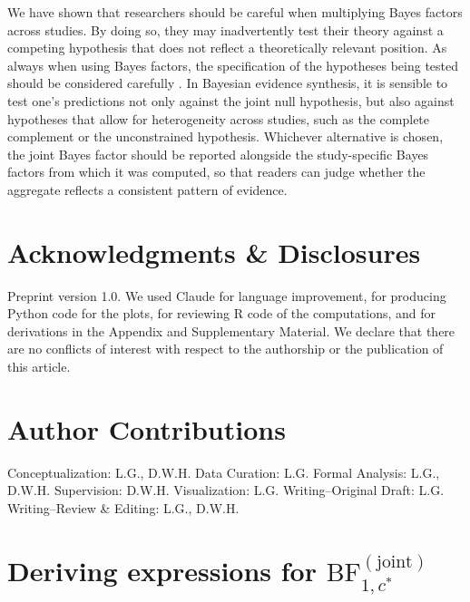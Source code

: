 \documentclass[letterpaper,11pt,oneside]{article}
\begin{document}
We have shown that researchers should be careful when multiplying Bayes factors across studies. By doing so, they may inadvertently test their theory against a competing hypothesis that does not reflect a theoretically relevant position. As always when using Bayes factors, the specification of the hypotheses being tested should be considered carefully \parencite{heckReviewApplicationsBayes2023, tendeiroReviewIssuesNull2019}. In Bayesian evidence synthesis, it is sensible to test one's predictions not only against the joint null hypothesis, but also against hypotheses that allow for heterogeneity across studies, such as the complete complement or the unconstrained hypothesis. Whichever alternative is chosen, the joint Bayes factor should be reported alongside the study-specific Bayes factors from which it was computed, so that readers can judge whether the aggregate reflects a consistent pattern of evidence.
\FloatBarrier %

\section*{Acknowledgments \& Disclosures}

Preprint version 1.0. We used Claude \parencite{anthropicClaudeOpus2026} for language improvement, for producing Python code for the plots, for reviewing R code of the computations, and for derivations in the Appendix and Supplementary Material. We declare that there are no conflicts of interest with respect to the authorship or the publication of this article.

\section*{Author Contributions}

Conceptualization: L.G., D.W.H.
Data Curation: L.G.
Formal Analysis: L.G., D.W.H.
Supervision: D.W.H.
Visualization: L.G. 
Writing--Original Draft: L.G.
Writing--Review \& Editing: L.G., D.W.H.

\printbibliography

\appendix
\section{Deriving expressions for \texorpdfstring{\boldmath$\mathrm{BF}^{(\mathrm{joint})}_{1,c^*}$}{BF1c*}}
\label{app:closed-form}
\end{document}
